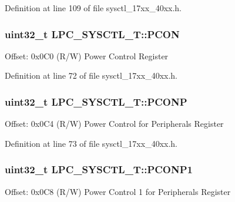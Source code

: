 Definition at line 109 of file sysctl\+\_\+17xx\+\_\+40xx.\+h.

\subsubsection[{\texorpdfstring{P\+C\+ON}{PCON}}]{ uint32\+\_\+t L\+P\+C\+\_\+\+S\+Y\+S\+C\+T\+L\+\_\+\+T\+::\+P\+C\+ON}\hypertarget{structLPC__SYSCTL__T_a92e2ea242fb2d75af44c1979a8cf9ce4}{}\label{structLPC__SYSCTL__T_a92e2ea242fb2d75af44c1979a8cf9ce4}
Offset\+: 0x0\+C0 (R/W) Power Control Register 

Definition at line 72 of file sysctl\+\_\+17xx\+\_\+40xx.\+h.

\subsubsection[{\texorpdfstring{P\+C\+O\+NP}{PCONP}}]{ uint32\+\_\+t L\+P\+C\+\_\+\+S\+Y\+S\+C\+T\+L\+\_\+\+T\+::\+P\+C\+O\+NP}\hypertarget{structLPC__SYSCTL__T_a27650e24e19bd3b8db140db39d9ab1c4}{}\label{structLPC__SYSCTL__T_a27650e24e19bd3b8db140db39d9ab1c4}
Offset\+: 0x0\+C4 (R/W) Power Control for Peripherals Register 

Definition at line 73 of file sysctl\+\_\+17xx\+\_\+40xx.\+h.

\subsubsection[{\texorpdfstring{P\+C\+O\+N\+P1}{PCONP1}}]{ uint32\+\_\+t L\+P\+C\+\_\+\+S\+Y\+S\+C\+T\+L\+\_\+\+T\+::\+P\+C\+O\+N\+P1}\hypertarget{structLPC__SYSCTL__T_a7e1241849ab9c934991342896ba7c296}{}\label{structLPC__SYSCTL__T_a7e1241849ab9c934991342896ba7c296}
Offset\+: 0x0\+C8 (R/W) Power Control 1 for Peripherals Register 


